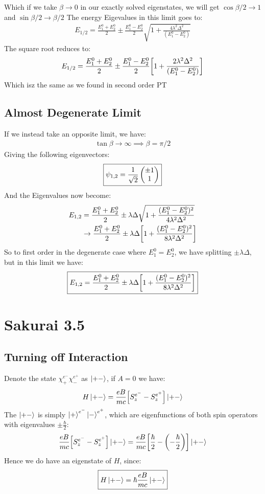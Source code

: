 \documentclass[12pt]{article}
\begin{document}
Which if we take $\beta\to0$ in our exactly solved eigenstates, we will get $\cos\beta/2\to1$ and $\sin\beta/2\to\beta/2$ The energy Eigevalues in this limit goes to:
\begin{align*}
  E_{1/2}=\frac{E_1^0+E_2^0}{2}\pm\frac{E_1^0-E_2^0}{2}
  \sqrt{1+\frac{4\lambda^2\Delta^2}{(E_1^0-E_2^0)}}
\end{align*}
The square root reduces to:
\begin{align*}
  E_{1/2}=\frac{E_1^0+E_2^0}{2}\pm\frac{E_1^0-E_2^0}{2}
  \qty[1+\frac{2\lambda^2\Delta^2}{(E_1^0-E_2^0)}]
\end{align*}
Which isz the same as we found in second order PT

\subsection{Almost Degenerate Limit}
If we instead take an opposite limit, we have:
\begin{align*}
  \tan\beta\to\infty\implies\beta=\pi/2
\end{align*}
Giving the following eigenvectors:
\begin{align}
  \boxed{\psi_{1,2}=\frac1{\sqrt{2}}\pmqty{\pm1\\1}}
\end{align}
And the Eigenvalues now become:
\begin{align*}
  E_{1,2}&=\frac{E_1^0+E_2^0}{2}\pm\lambda\Delta
  \sqrt{1+\frac{(E_1^0-E_2^0)^2}{4\lambda^2\Delta^2}}\\
  &\to \frac{E_1^0+E_2^0}{2}\pm\lambda\Delta
  \qty[1+\frac{(E_1^0-E_2^0)^2}{8\lambda^2\Delta^2}]
\end{align*}
So to first order in the degenerate case where $E_1^0=E_2^0$, we have splitting $\pm\lambda\Delta$, but in this limit we have:
\begin{align}
  \boxed{E_{1,2}=\frac{E_1^0+E_2^0}{2}\pm\lambda\Delta
  \qty[1+\frac{(E_1^0-E_2^0)^2}{8\lambda^2\Delta^2}]}
\end{align}

\section{Sakurai 3.5}
\subsection{Turning off Interaction}
Denote the state $\chi^{e^-}_+\chi^{e^+}_-$ as $\ket{+-}$, if $A=0$ we have:
\begin{align*}
  H\ket{+-}=\frac{eB}{mc}\qty[S_z^{e^-}-S_z^{e^+}]\ket{+-}
\end{align*}
The $\ket{+-}$ is simply $\ket{+}^{e^{-}}\ket{-}^{e^{+}}$, which are eigenfunctions of both spin operators with eigenvalues $\pm\frac\hbar2$:
\begin{align*}
  \frac{eB}{mc}\qty[S_z^{e^-}-S_z^{e^+}]\ket{+-}=
  \frac{eB}{mc}\qty[\frac\hbar2-\qty(-\frac\hbar2)]\ket{+-}
\end{align*}
Hence we do have an eigenstate of $H$, since:
\begin{align}
  \boxed{H\ket{+-}=\hbar\frac{eB}{mc}\ket{+-}}
\end{align}
\end{document}
